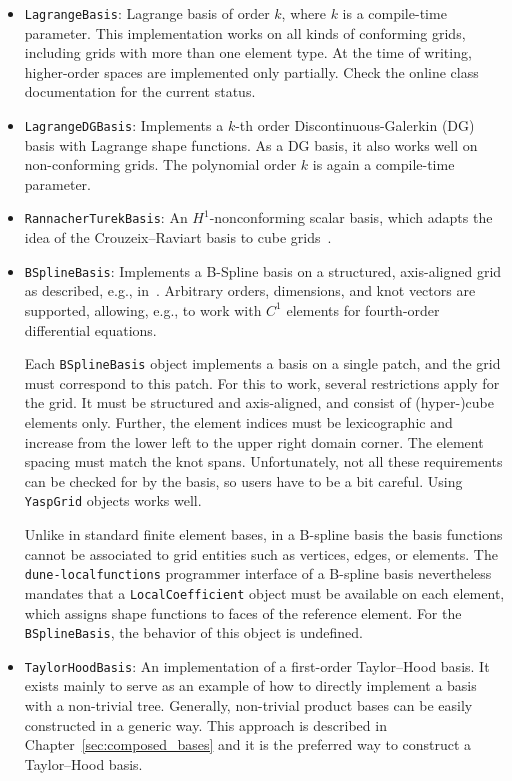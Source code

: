 \documentclass[a4paper,10pt,headings=normal,bibliography=totoc]{scrartcl}
\newcommand{\cpp}[1]{\lstinline[basicstyle=\ttfamily]!#1!}
\newcommand{\dunemodule}[1]{\texttt{#1}}
\begin{document}
\begin{itemize}
 \item \cpp{LagrangeBasis}: Lagrange basis of order $k$, where $k$ is a compile-time parameter.
   This implementation works on all kinds of conforming grids, including grids with more
   than one element type.  At the time of writing, higher-order spaces are implemented only partially.
   Check the online class documentation for the current status.

 \item \cpp{LagrangeDGBasis}: Implements a $k$-th order Discontinuous-Galerkin (DG) basis with Lagrange shape functions.
   As a DG basis, it also
   works well on non-conforming grids.  The polynomial order $k$ is again a compile-time parameter.

 \item \cpp{RannacherTurekBasis}: An $H^1$-nonconforming scalar basis, which adapts the idea
   of the Crouzeix--Raviart basis to cube grids~\cite{rannacher_turek:1992}.

 \item \cpp{BSplineBasis}:  Implements a B-Spline basis on a structured, axis-aligned grid as described,
   e.g., in~\cite{cottrell_hughes_bazilevs:2009}.  Arbitrary orders, dimensions, and knot vectors are supported,
   allowing, e.g., to work with $C^1$ elements for fourth-order differential equations.

   Each \cpp{BSplineBasis} object implements a basis on a single patch, and the grid must correspond to this
   patch. For this to work, several restrictions apply for the grid.  It must be structured and axis-aligned,
   and consist of (hyper-)cube elements only.  Further, the element indices must be lexicographic and
   increase from the lower left to the upper right domain corner.  The element spacing must match the knot spans.
   Unfortunately, not all these requirements can be checked for by the basis, so users have to be a bit
   careful.  Using \cpp{YaspGrid} objects works well.

   Unlike in standard finite element bases, in a B-spline basis the basis functions cannot be associated
   to grid entities such as vertices, edges, or elements.  The \dunemodule{dune-localfunctions}
   programmer interface of a B-spline basis nevertheless mandates that a
   \cpp{LocalCoefficient} object must be available on each element, which assigns shape functions
   to faces of the reference element. For the \cpp{BSplineBasis}, the behavior of this
   object is undefined.

 \item \cpp{TaylorHoodBasis}:
   An implementation of a first-order Taylor--Hood basis.  It exists mainly to serve as an example of
   how to directly implement a basis with a non-trivial tree.
   Generally, non-trivial product bases
   can be easily constructed in a generic way. This approach is described
   in Chapter~\ref{sec:composed_bases} and it is the preferred way to construct
   a Taylor--Hood basis.
\end{itemize}
\end{document}

